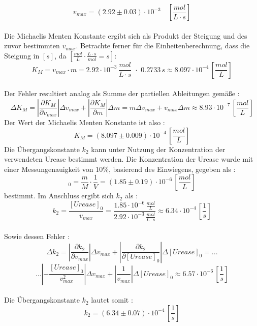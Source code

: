 \begin{equation}
v_{max} = (2.92 \pm 0.03 )\cdot 10^{-3}  \quad \left[\si{\frac{mol}{L\cdot s}}\right]
\end{equation}\\
Die Michaelis Menten Konstante ergibt sich als Produkt der Steigung und des zuvor bestimmten $v_{max}$. Betrachte ferner für die Einheitenberechnung, dass die Steigung in $  [\si{s}]$, da $ [\si{\frac{mol}{L}\cdot \frac{L\cdot s}{mol} = s}]$: 
\begin{equation}
K_M = v_{max} \cdot m = 2.92 \cdot 10^{-3} \, \si{\frac{mol}{L\cdot s}}\,\, \cdot \,\,0.2733  \,\si{s} \approx 8.097 \cdot 10^{-4} \, [\si{\frac{mol}{L}}]
\end{equation}\\
Der Fehler resultiert analog als Summe der partiellen Ableitungen gemäße : 
\begin{equation}
\Delta K_M = |\frac{\partial K_M}{\partial v_{max}}|\Delta v_{max} + |\frac{\partial K_M}{\partial m}|\Delta m  = m \Delta v_{max} + v_{max}\Delta m \approx 8.93 \cdot 10^{-7} \,[\si{\frac{mol}{L}}]
\end{equation}
Der Wert der Michaelis Menten Konstante ist also : 
\begin{equation}
K_M = (8.097 \pm 0.009) \cdot 10^{-4} \,[\si{\frac{mol}{L}}]
\end{equation}
Die Übergangskonstante $k_2$ kann unter Nutzung der Konzentration der verwendeten Urease bestimmt werden. Die Konzentration der Urease wurde mit einer Messungenauigkeit von $10\%$, basierend des  Einwiegens, gegeben als :
\begin{equation}
[Urease]_0 = \frac{m}{M}\cdot \frac{1}{V} =  (1.85 \pm 0.19)\cdot 10^{-6} \,\left[\si{\frac{mol}{L}}\right]
\end{equation} 
bestimmt. Im Anschluss ergibt sich $k_2$ als : 
\begin{equation}
k_2 = \frac{[Urease]_0}{v_{max}} = \frac{1.85 \cdot 10^{-6} \, \si{\frac{mol}{L}}}{2.92\cdot 10^{-3}\, \si{\frac{mol}{L\cdot s}}} \approx 6.34 \cdot 10^{-4} \, \left[\si{\frac{1}{s}}\right]
\label{eq:k2}
\end{equation}
\\
Sowie dessen Fehler : 
\begin{equation}
\Delta k_2 = \left|\frac{\partial k_2}{\partial v_{max}}\right|\Delta v_{max} + \left|\frac{\partial k_2}{\partial [Urease]_0}\right|\Delta [Urease]_0  = ...
\end{equation}
\begin{equation*}
... \left|-\frac{[Urease]_0}{v_{max}^2}\right| \Delta v_{max} + \left|\frac{1}{v_{max}}\right|\Delta [Urease]_0 \approx 6.57 \cdot 10^{-6} \,\left[\si{\frac{1}{s}}\right]
\end{equation*}
\\
Die Übergangskonstante $k_2$ lautet somit : 
\begin{equation}
k_2 = (6.34 \pm 0.07)\cdot 10^{-4}\,\left[\si{\frac{1}{s}}\right]
\end{equation}
%